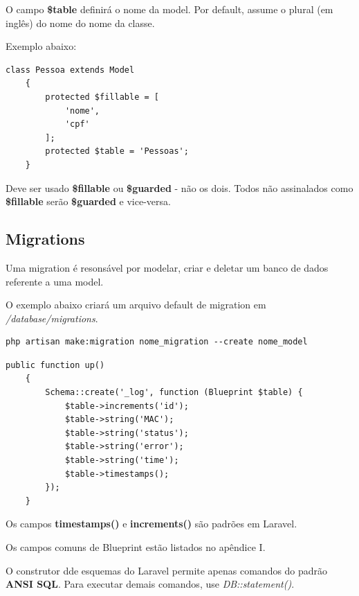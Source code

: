 \documentclass[
12pt,				%
openany,			%
twoside,			%
a4paper,			%
english,			%
french,				%
spanish,			%
brazil,				%
]{abntex2}
\begin{document}
O campo \textbf{\$table} definirá o nome da model. Por default, assume o plural (em inglês) do
nome do nome da classe.

Exemplo abaixo:

\begin{lstlisting}[style=php,caption={\textit{app/Pessoa.php}}]
    class Pessoa extends Model
    {
        protected $fillable = [
            'nome',
            'cpf'
        ];
        protected $table = 'Pessoas';
    }
\end{lstlisting}

\begin{leftbar}
    Deve ser usado \textbf{\$fillable} ou \textbf{\$guarded }- não os dois. Todos não assinalados como \textbf{\$fillable} serão \textbf{\$guarded} e vice-versa.
\end{leftbar}

\subsection{Migrations}
Uma migration é resonsável por modelar, criar e deletar um banco de dados referente a uma model.

O exemplo abaixo criará um arquivo default de migration em \textit{/database/migrations}.

\begin{lstlisting}[style=bash,caption={Criando uma migration}]
    php artisan make:migration nome_migration --create nome_model
\end{lstlisting}


\begin{lstlisting}[style=php,caption={Arquivo de migration exemplo}]
    public function up()
    {
        Schema::create('_log', function (Blueprint $table) {
            $table->increments('id');
            $table->string('MAC');
            $table->string('status');
            $table->string('error');
            $table->string('time');
            $table->timestamps();
        });
    }
\end{lstlisting}

Os campos \textbf{timestamps()} e \textbf{increments()} são padrões em Laravel.

Os campos comuns de Blueprint estão listados no apêndice I.

\begin{leftbar}
    O construtor dde esquemas do Laravel permite apenas comandos do padrão \textbf{ANSI SQL}. Para executar demais comandos, use \textit{DB::statement()}.
\end{leftbar}
\end{document}
